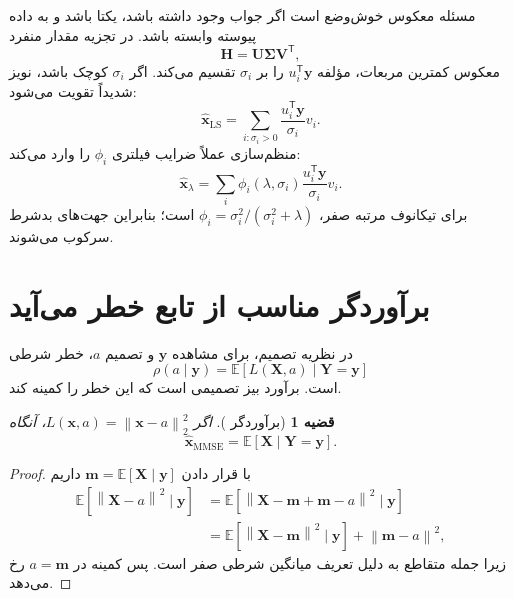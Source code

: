 \documentclass[12pt,openany,oneside]{book}
\newtheorem{theorem}{قضیه}[chapter]
\newcommand{\E}{\mathbb{E}}
\newcommand{\norm}[1]{\left\lVert #1\right\rVert}
\newcommand{\trans}{^{\mathsf T}}
\newcommand{\vect}[1]{\bm{#1}}
\begin{document}
مسئله معکوس خوش‌وضع است اگر جواب وجود داشته باشد، یکتا باشد و به داده پیوسته وابسته باشد. در تجزیه مقدار منفرد
\begin{equation}
\vect H=\vect U\vect\Sigma\vect V\trans,
\end{equation}
معکوس کمترین مربعات، مؤلفه \(u_i\trans\vect y\) را بر \(\sigma_i\) تقسیم می‌کند. اگر \(\sigma_i\) کوچک باشد، نویز شدیداً تقویت می‌شود:
\begin{equation}
\widehat{\vect x}_{\mathrm{LS}}
=\sum_{i:\sigma_i>0}\frac{u_i\trans\vect y}{\sigma_i}v_i.
\label{eq:svd-inverse}
\end{equation}
منظم‌سازی عملاً ضرایب فیلتری \(\phi_i\) را وارد می‌کند:
\begin{equation}
\widehat{\vect x}_{\lambda}
=\sum_i \phi_i(\lambda,\sigma_i)\frac{u_i\trans\vect y}{\sigma_i}v_i.
\end{equation}
برای تیکانوف مرتبه صفر، \(\phi_i=\sigma_i^2/(\sigma_i^2+\lambda)\) است؛ بنابراین جهت‌های بدشرط سرکوب می‌شوند.

\section{برآوردگر مناسب از تابع خطر می‌آید}

در نظریه تصمیم، برای مشاهده \(\vect y\) و تصمیم \(a\)، خطر شرطی
\begin{equation}
\rho(a\mid\vect y)=\E[L(\vect X,a)\mid\vect Y=\vect y]
\end{equation}
است. برآورد بیز تصمیمی است که این خطر را کمینه کند.

\begin{theorem}[برآوردگر ]
اگر \(L(\vect x,a)=\norm{\vect x-a}_2^2\)، آنگاه
\begin{equation}
\widehat{\vect x}_{\mathrm{MMSE}}=\E[\vect X\mid\vect Y=\vect y].
\label{eq:mmse}
\end{equation}
\end{theorem}
\begin{proof}
با قرار دادن \(\vect m=\E[\vect X\mid\vect y]\) داریم
\begin{align}
\E[\norm{\vect X-a}^2\mid\vect y]
&=\E[\norm{\vect X-\vect m+\vect m-a}^2\mid\vect y]\\
&=\E[\norm{\vect X-\vect m}^2\mid\vect y]+\norm{\vect m-a}^2,
\end{align}
زیرا جمله متقاطع به دلیل تعریف میانگین شرطی صفر است. پس کمینه در \(a=\vect m\) رخ می‌دهد.
\end{proof}
\end{document}
